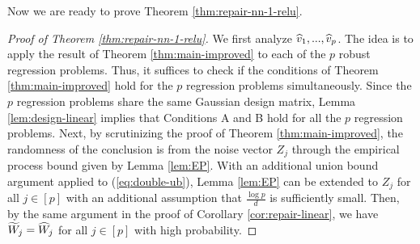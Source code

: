 Now we are ready to prove Theorem \ref{thm:repair-nn-1-relu}.
\begin{proof}[Proof of Theorem \ref{thm:repair-nn-1-relu}]
We first analyze $\widehat{v}_1,...,\widehat{v}_p$. The idea is to apply the result of Theorem \ref{thm:main-improved} to each of the $p$ robust regression problems. Thus, it suffices to check if the conditions of Theorem \ref{thm:main-improved} hold for the $p$ regression problems simultaneously. Since the $p$ regression problems share the same Gaussian design matrix, Lemma \ref{lem:design-linear} implies that Conditions A and B hold for all the $p$ regression problems. Next, by scrutinizing the proof of Theorem \ref{thm:main-improved}, the randomness of the conclusion is from the noise vector $Z_j$ through the empirical process bound given by Lemma \ref{lem:EP}. With an additional union bound argument applied to (\ref{eq:double-ub}), Lemma \ref{lem:EP} can be extended to $Z_j$ for all $j\in[p]$ with an additional assumption that $\frac{\log p}{d}$ is sufficiently small. Then, by the same argument in the proof of Corollary \ref{cor:repair-linear}, we have $\widetilde{W}_j=\widehat{W}_j$ for all $j\in[p]$ with high probability.


\end{proof}
